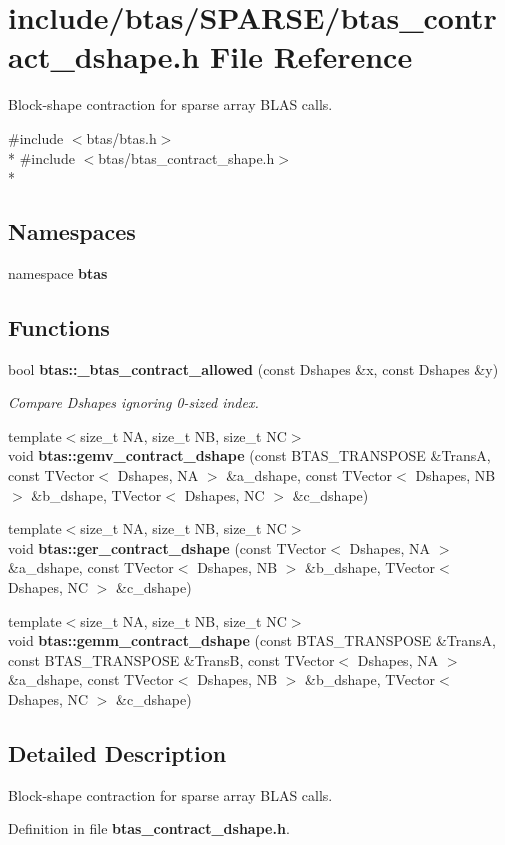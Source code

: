 \section{include/btas/\-S\-P\-A\-R\-S\-E/btas\-\_\-contract\-\_\-dshape.h File Reference}
\label{de/d95/btas__contract__dshape_8h}


Block-\/shape contraction for sparse array B\-L\-A\-S calls.  


{\ttfamily \#include $<$btas/btas.\-h$>$}\\*
{\ttfamily \#include $<$btas/btas\-\_\-contract\-\_\-shape.\-h$>$}\\*
\subsection*{Namespaces}
\begin{DoxyCompactItemize}
\item 
namespace {\bf btas}
\end{DoxyCompactItemize}
\subsection*{Functions}
\begin{DoxyCompactItemize}
\item 
bool {\bf btas\-::\-\_\-btas\-\_\-contract\-\_\-allowed} (const Dshapes \&x, const Dshapes \&y)
\begin{DoxyCompactList}\small\item\em Compare Dshapes ignoring 0-\/sized index. \end{DoxyCompactList}\item 
{\footnotesize template$<$size\-\_\-t N\-A, size\-\_\-t N\-B, size\-\_\-t N\-C$>$ }\\void {\bf btas\-::gemv\-\_\-contract\-\_\-dshape} (const B\-T\-A\-S\-\_\-\-T\-R\-A\-N\-S\-P\-O\-S\-E \&Trans\-A, const T\-Vector$<$ Dshapes, N\-A $>$ \&a\-\_\-dshape, const T\-Vector$<$ Dshapes, N\-B $>$ \&b\-\_\-dshape, T\-Vector$<$ Dshapes, N\-C $>$ \&c\-\_\-dshape)
\item 
{\footnotesize template$<$size\-\_\-t N\-A, size\-\_\-t N\-B, size\-\_\-t N\-C$>$ }\\void {\bf btas\-::ger\-\_\-contract\-\_\-dshape} (const T\-Vector$<$ Dshapes, N\-A $>$ \&a\-\_\-dshape, const T\-Vector$<$ Dshapes, N\-B $>$ \&b\-\_\-dshape, T\-Vector$<$ Dshapes, N\-C $>$ \&c\-\_\-dshape)
\item 
{\footnotesize template$<$size\-\_\-t N\-A, size\-\_\-t N\-B, size\-\_\-t N\-C$>$ }\\void {\bf btas\-::gemm\-\_\-contract\-\_\-dshape} (const B\-T\-A\-S\-\_\-\-T\-R\-A\-N\-S\-P\-O\-S\-E \&Trans\-A, const B\-T\-A\-S\-\_\-\-T\-R\-A\-N\-S\-P\-O\-S\-E \&Trans\-B, const T\-Vector$<$ Dshapes, N\-A $>$ \&a\-\_\-dshape, const T\-Vector$<$ Dshapes, N\-B $>$ \&b\-\_\-dshape, T\-Vector$<$ Dshapes, N\-C $>$ \&c\-\_\-dshape)
\end{DoxyCompactItemize}


\subsection{Detailed Description}
Block-\/shape contraction for sparse array B\-L\-A\-S calls. 

Definition in file {\bf btas\-\_\-contract\-\_\-dshape.\-h}.

